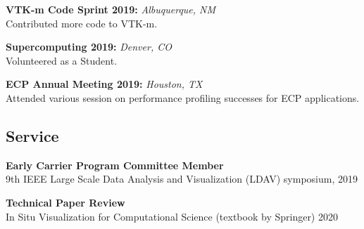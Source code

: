 \documentclass[12pt,letter]{article}
\begin{document}
\noindent \textbf{VTK-m Code Sprint 2019:} \textit{Albuquerque, NM}
\\
Contributed more code to VTK-m.

\noindent \textbf{Supercomputing 2019:} \textit{Denver, CO}
\\
Volunteered as a Student.

\noindent \textbf{ECP Annual Meeting 2019:} \textit{Houston, TX}
\\
Attended various session on performance profiling successes for ECP applications.

\subsection*{Service}
\noindent \textbf{Early Carrier Program Committee Member}
\\
9th IEEE Large Scale Data Analysis and Visualization (LDAV) symposium, 2019

\noindent \textbf{Technical Paper Review}
\\
In Situ Visualization for Computational Science (textbook by Springer) 2020
\end{document}
